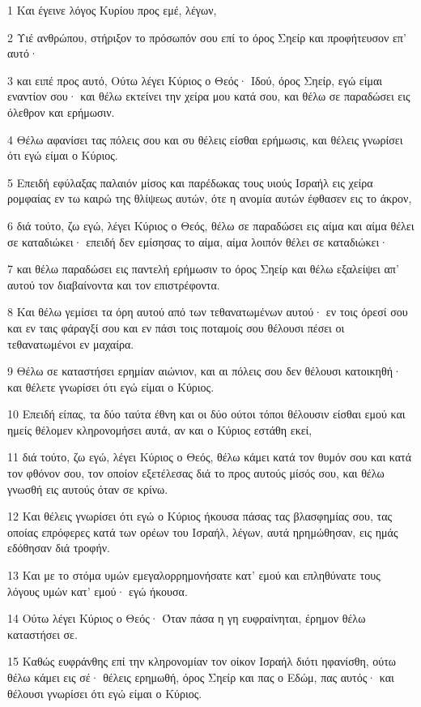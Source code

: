 \par 1 Και έγεινε λόγος Κυρίου προς εμέ, λέγων,
\par 2 Υιέ ανθρώπου, στήριξον το πρόσωπόν σου επί το όρος Σηείρ και προφήτευσον επ' αυτό·
\par 3 και ειπέ προς αυτό, Ούτω λέγει Κύριος ο Θεός· Ιδού, όρος Σηείρ, εγώ είμαι εναντίον σου· και θέλω εκτείνει την χείρα μου κατά σου, και θέλω σε παραδώσει εις όλεθρον και ερήμωσιν.
\par 4 Θέλω αφανίσει τας πόλεις σου και συ θέλεις είσθαι ερήμωσις, και θέλεις γνωρίσει ότι εγώ είμαι ο Κύριος.
\par 5 Επειδή εφύλαξας παλαιόν μίσος και παρέδωκας τους υιούς Ισραήλ εις χείρα ρομφαίας εν τω καιρώ της θλίψεως αυτών, ότε η ανομία αυτών έφθασεν εις το άκρον,
\par 6 διά τούτο, ζω εγώ, λέγει Κύριος ο Θεός, θέλω σε παραδώσει εις αίμα και αίμα θέλει σε καταδιώκει· επειδή δεν εμίσησας το αίμα, αίμα λοιπόν θέλει σε καταδιώκει·
\par 7 και θέλω παραδώσει εις παντελή ερήμωσιν το όρος Σηείρ και θέλω εξαλείψει απ' αυτού τον διαβαίνοντα και τον επιστρέφοντα.
\par 8 Και θέλω γεμίσει τα όρη αυτού από των τεθανατωμένων αυτού· εν τοις όρεσί σου και εν ταις φάραγξί σου και εν πάσι τοις ποταμοίς σου θέλουσι πέσει οι τεθανατωμένοι εν μαχαίρα.
\par 9 Θέλω σε καταστήσει ερημίαν αιώνιον, και αι πόλεις σου δεν θέλουσι κατοικηθή· και θέλετε γνωρίσει ότι εγώ είμαι ο Κύριος.
\par 10 Επειδή είπας, τα δύο ταύτα έθνη και οι δύο ούτοι τόποι θέλουσιν είσθαι εμού και ημείς θέλομεν κληρονομήσει αυτά, αν και ο Κύριος εστάθη εκεί,
\par 11 διά τούτο, ζω εγώ, λέγει Κύριος ο Θεός, θέλω κάμει κατά τον θυμόν σου και κατά τον φθόνον σου, τον οποίον εξετέλεσας διά το προς αυτούς μίσός σου, και θέλω γνωσθή εις αυτούς όταν σε κρίνω.
\par 12 Και θέλεις γνωρίσει ότι εγώ ο Κύριος ήκουσα πάσας τας βλασφημίας σου, τας οποίας επρόφερες κατά των ορέων του Ισραήλ, λέγων, αυτά ηρημώθησαν, εις ημάς εδόθησαν διά τροφήν.
\par 13 Και με το στόμα υμών εμεγαλορρημονήσατε κατ' εμού και επληθύνατε τους λόγους υμών κατ' εμού· εγώ ήκουσα.
\par 14 Ούτω λέγει Κύριος ο Θεός· Όταν πάσα η γη ευφραίνηται, έρημον θέλω καταστήσει σε.
\par 15 Καθώς ευφράνθης επί την κληρονομίαν τον οίκον Ισραήλ διότι ηφανίσθη, ούτω θέλω κάμει εις σέ· θέλεις ερημωθή, όρος Σηείρ και πας ο Εδώμ, πας αυτός· και θέλουσι γνωρίσει ότι εγώ είμαι ο Κύριος.

